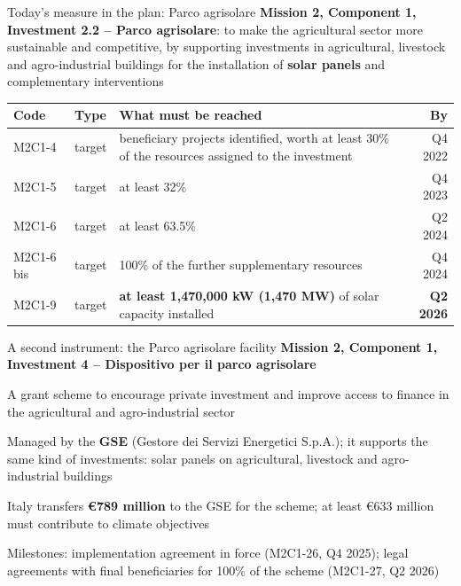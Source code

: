 \documentclass[aspectratio=169,xcolor=table]{beamer}
\begin{document}
\begin{frame}{Today's measure in the plan: Parco agrisolare}
\small
\textbf{Mission 2, Component 1, Investment 2.2 -- Parco agrisolare}: to make the agricultural sector more sustainable and competitive, by supporting investments in agricultural, livestock and agro-industrial buildings for the installation of \textbf{solar panels} and complementary interventions
\vspace{0.1cm}

\centering\scriptsize
\begin{tabular}{llL{6.2cm}r}
\toprule
\textbf{Code} & \textbf{Type} & \textbf{What must be reached} & \textbf{By} \\
\midrule
M2C1-4 & target & beneficiary projects identified, worth at least 30\% of the resources assigned to the investment & Q4 2022 \\
M2C1-5 & target & at least 32\% & Q4 2023 \\
M2C1-6 & target & at least 63.5\% & Q2 2024 \\
M2C1-6 bis & target & 100\% of the further supplementary resources & Q4 2024 \\
M2C1-9 & target & \textbf{at least 1,470,000 kW (1,470 MW)} of solar capacity installed & \textbf{Q2 2026} \\
\bottomrule
\end{tabular}
\end{frame}

\begin{frame}{A second instrument: the Parco agrisolare facility}
\small
\textbf{Mission 2, Component 1, Investment 4 -- Dispositivo per il parco agrisolare}
\bi
  \item A grant scheme to encourage private investment and improve access to finance in the agricultural and agro-industrial sector
  \item Managed by the \textbf{GSE} (Gestore dei Servizi Energetici S.p.A.); it supports the same kind of investments: solar panels on agricultural, livestock and agro-industrial buildings
  \item Italy transfers \textbf{€789 million} to the GSE for the scheme; at least €633 million must contribute to climate objectives
  \item Milestones: implementation agreement in force (M2C1-26, Q4 2025); legal agreements with final beneficiaries for 100\% of the scheme (M2C1-27, Q2 2026)
\ei
{}
\end{frame}
\end{document}

